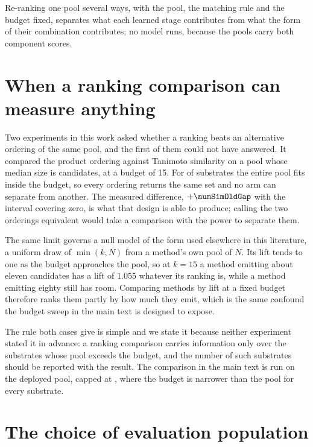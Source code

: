 \documentclass[journal=jcisd8,manuscript=suppinfo,layout=onecolumn]{achemso}
\begin{document}
Re-ranking one pool several ways, with the pool, the matching rule and the budget fixed, separates
what each learned stage contributes from what the form of their combination contributes; no model
runs, because the pools carry both component scores.
\section{When a ranking comparison can measure anything}
\label{sec:si-rankingpower}

Two experiments in this work asked whether a ranking beats an alternative ordering of the same
pool, and the first of them could not have answered. It compared the product ordering against
Tanimoto similarity on a pool whose median size is \numSimOldMedianPool{} candidates, at a budget
of 15. For \numSimOldPoolUnderBudget{} of \numSimOldN{} substrates the entire pool fits inside
the budget, so every ordering returns the same set and no arm can separate from another. The
measured difference, $+\numSimOldGap$ with the interval covering zero, is what that design is
able to produce; calling the two orderings equivalent would take a comparison with the power to
separate them.

The same limit governs a null model of the form used elsewhere in this literature, a uniform draw
of $\min(k, N)$ from a method's own pool of $N$.
Its lift tends to one as the budget approaches
the pool, so at $k=15$ a method emitting about eleven candidates has a lift of $1.055$ whatever
its ranking is, while a method emitting eighty still has room. Comparing methods by lift at a
fixed budget therefore ranks them partly by how much they emit, which is the same confound the
budget sweep in the main text is designed to expose.

The rule both cases give is simple and we state it because neither experiment stated it in
advance: a ranking comparison carries information only over the substrates whose pool exceeds the
budget, and the number of such substrates should be reported with the result.
The comparison in
the main text is run on the deployed pool, capped at \numCaseExhCandidates{}, where the budget is
narrower than the pool for every substrate.

\section{The choice of evaluation population}
\label{sec:si-population}
\end{document}
